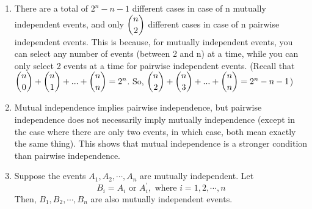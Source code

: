 \begin{note}
\end{note}
\begin{enumerate}
    \item There are a total of $2^n - n - 1$ different cases in case of n mutually independent events, and only $\dbinom{n}{2}$ different cases in case of n pairwise independent events. This is because, for mutually independent events, you can select any number of events (between 2 and n) at a time, while you can only select 2 events at a time for pairwise independent events. (Recall that $\dbinom{n}{0} + \dbinom{n}{1} + ... + \dbinom{n}{n} = 2^n$. So, $\dbinom{n}{2} + \dbinom{n}{3} + ... + \dbinom{n}{n} = 2^n - n - 1$)
    \item Mutual independence implies pairwise independence, but pairwise independence does not necessarily imply mutually independence (except in the case where there are only two events, in which case, both mean exactly the same thing). This shows that mutual independence is a stronger condition than pairwise independence.
    \item Suppose the events $A_1, A_2, \cdots, A_n$ are mutually independent. Let 
    $$
    B_i = A_i \text{ or } A_{i}^{'}, \text{ where }i = 1,2,\cdots,n
    $$
    Then, $B_1, B_2, \cdots, B_n$ are also mutually independent events.
\end{enumerate}


